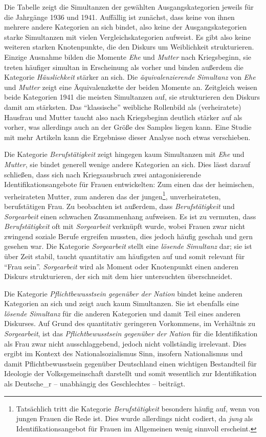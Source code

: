 \documentclass[12pt, titlepage=true, toc=bib]{scrartcl}
\begin{document}
{\noindent Die Tabelle zeigt die Simultanzen der gewählten Ausgangskategorien jeweils für die Jahrgänge 1936 und 1941. Auffällig ist zunächst, dass keine von ihnen mehrere andere Kategorien an sich bindet, also keine der Ausgangskategorien starke Simultanzen mit vielen Vergleichskategorien aufweist. Es gibt also keine weiteren starken Knotenpunkte, die den Diskurs um Weiblichkeit strukturieren. Einzige Ausnahme bilden die Momente \textit{Ehe} und \textit{Mutter} nach Kriegsbeginn, sie treten häufiger simultan in Erscheinung als vorher und binden außerdem die Kategorie \textit{Häuslichkeit} stärker an sich. Die \textit{äquivalenzierende Simultanz} von \textit{Ehe} und \textit{Mutter} zeigt eine Äquivalenzkette der beiden Momente an. Zeitgleich weisen beide Kategorien 1941 die meisten Simultanzen auf, sie strukturieren den Diskurs damit am stärksten. Das "`klassische"' weibliche Rollenbild als (verheiratete) Hausfrau und Mutter taucht also nach Kriegsbeginn deutlich stärker auf als vorher, was allerdings auch an der Größe des Samples liegen kann. Eine Studie mit mehr Artikeln kann die Ergebnisse dieser Analyse noch etwas verschieben.

Die Kategorie \textit{Berufstätigkeit} zeigt hingegen kaum Simultanzen mit \textit{Ehe} und \textit{Mutter}, sie bindet generell wenige andere Kategorien an sich. Dies lässt darauf schließen, dass sich nach Kriegsausbruch zwei antagonisierende Identifikationsangebote für Frauen entwickelten: Zum einen das der heimischen, verheirateten Mutter, zum anderen das der jungen\footnote{Tatsächlich tritt die Kategorie \textit{Berufstätigkeit} besonders häufig auf, wenn von jungen Frauen die Rede ist. Dies wurde allerdings nicht codiert, da \textit{jung} als Identifikationsangebot für Frauen im Allgemeinen wenig sinnvoll erscheint.}, unverheirateten, berufstätigen Frau. Zu beobachten ist außerdem, dass \textit{Berufstätigkeit} und \textit{Sorgearbeit} einen schwachen Zusammenhang aufweisen. Es ist zu vermuten, dass \textit{Berufstätigkeit} oft mit \textit{Sorgearbeit} verknüpft wurde, wobei Frauen zwar nicht zwingend soziale Berufe ergreifen mussten, dies jedoch häufig geschah und gern gesehen war. Die Kategorie \textit{Sorgearbeit} stellt eine \textit{lösende Simultanz} dar; sie ist über Zeit stabil, taucht quantitativ am häufigsten auf und somit relevant für "`Frau sein"'. \textit{Sorgearbeit} wird als Moment oder Knotenpunkt einen anderen Diskurs strukturieren, der sich mit dem hier untersuchten überschneidet. 

Die Kategorie \textit{Pflichtbewusstsein gegenüber der Nation} bindet keine anderen Kategorien an sich und zeigt auch kaum Simultanzen. Sie ist ebenfalls eine \textit{lösende Simultanz} für die anderen Kategorien und damit Teil eines anderen Diskurses. Auf Grund des quantitativ geringeren Vorkommens, im Verhältnis zu \textit{Sorgearbeit}, ist das \textit{Pflichtbewusstsein gegenüber der Nation} für die Identifikation als Frau zwar nicht ausschlaggebend, jedoch nicht vollständig irrelevant. Dies ergibt im Kontext des Nationalsozialismus Sinn, insofern Nationalismus und damit Pflichtbewusstsein gegenüber Deutschland einen wichtigen Bestandteil für Ideologie der Volksgemeinschaft darstellt und somit wesentlich zur Identifikation als Deutsche\_r -- unabhängig des Geschlechtes -- beiträgt.

}
\end{document}
